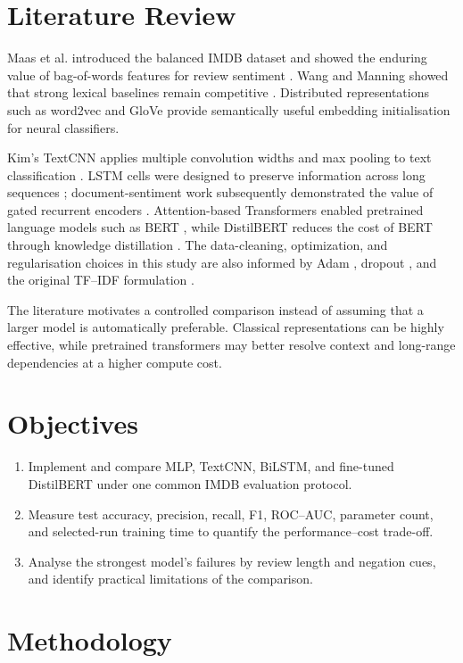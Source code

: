 \documentclass[12pt,a4paper]{article}
\begin{document}
\section{Literature Review}
Maas et al. introduced the balanced IMDB dataset and showed the enduring value of bag-of-words features for review sentiment \cite{maas}. Wang and Manning showed that strong lexical baselines remain competitive \cite{wang}. Distributed representations such as word2vec \cite{mikolov} and GloVe \cite{glove} provide semantically useful embedding initialisation for neural classifiers.

Kim's TextCNN applies multiple convolution widths and max pooling to text classification \cite{kim}. LSTM cells were designed to preserve information across long sequences \cite{lstm}; document-sentiment work subsequently demonstrated the value of gated recurrent encoders \cite{tang}. Attention-based Transformers \cite{vaswani} enabled pretrained language models such as BERT \cite{bert}, while DistilBERT reduces the cost of BERT through knowledge distillation \cite{distilbert}. The data-cleaning, optimization, and regularisation choices in this study are also informed by Adam \cite{adam}, dropout \cite{dropout}, and the original TF--IDF formulation \cite{salton}.

The literature motivates a controlled comparison instead of assuming that a larger model is automatically preferable. Classical representations can be highly effective, while pretrained transformers may better resolve context and long-range dependencies at a higher compute cost.

\section{Objectives}
\begin{enumerate}[label=\arabic*.]
\item Implement and compare MLP, TextCNN, BiLSTM, and fine-tuned DistilBERT under one common IMDB evaluation protocol.
\item Measure test accuracy, precision, recall, F1, ROC--AUC, parameter count, and selected-run training time to quantify the performance--cost trade-off.
\item Analyse the strongest model's failures by review length and negation cues, and identify practical limitations of the comparison.
\end{enumerate}

\section{Methodology}
\end{document}
